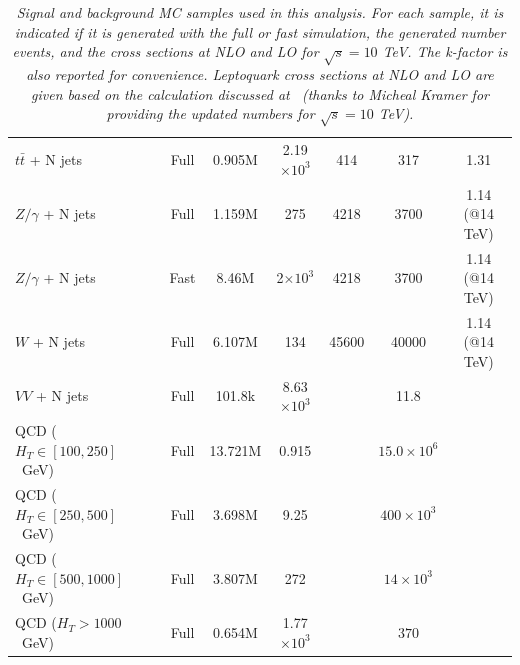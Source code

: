 \documentclass{cmspaper}
\begin{document}
\begin{linenumbers}
\begin{table}[htb]
\begin{center}
\begin{tabular}{|l|cccccc|}
\hline
      $t\bar{t}$ + N jets         & Full      & 0.905M    &    2.19$\times 10^3$   & 414                 &  317                  & 1.31 \\
      $Z/\gamma$ + N jets         & Full      & 1.159M    &    275	           & 4218                &  3700                 & 1.14 (@14 TeV)\\
      $Z/\gamma$ + N jets         & Fast      & 8.46M     &    2$\times 10^3$      & 4218                &  3700                 & 1.14 (@14 TeV)\\
      $W$ + N jets                & Full      & 6.107M    &     134	           & 45600               &  40000                & 1.14 (@14 TeV)\\
      $VV$ + N jets               & Full      & 101.8k    &    8.63$\times 10^3$   &                     &  11.8                 & \\ \hline
      QCD ($H_T\in[100,250]$~GeV) & Full      & 13.721M   &    0.915	           &                     &  $15.0 \times 10^6$   & \\
      QCD ($H_T\in[250,500]$~GeV) & Full      & 3.698M    &    9.25	           &                     &  $400 \times 10^3$    & \\
      QCD ($H_T\in[500,1000]$~GeV)& Full      & 3.807M    &     272	           &                     &  $14 \times 10^3$     & \\
      QCD ($H_T>1000$~GeV)        & Full      & 0.654M    &    1.77$\times 10^3$   &                     &  $370$                & \\
\hline\hline
    \end{tabular}
    \caption{\small \sl Signal and background MC samples used in this analysis. For each sample, it is indicated 
      if it is generated with the full or fast simulation, the generated number events, 
      and the cross sections at NLO and LO for $\sqrt{s}=10$ TeV. 
      The k-factor is also reported for convenience. Leptoquark cross sections at NLO and LO
      are given based on the calculation discussed at~\cite{Kramer} (thanks to Micheal Kramer 
      for providing the updated numbers for $\sqrt{s}=10$ TeV).}
  \end{center}
\end{table}


\end{linenumbers}
\end{document}
